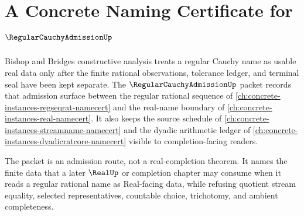 \chapter{A Concrete Naming Certificate for $\RegularCauchyAdmissionUp$}
\label{ch:concrete-instances-regular-cauchy-admission-namecert}

Bishop and Bridges constructive analysis treats a regular Cauchy name as usable real data only after the finite rational observations, tolerance ledger, and terminal seal have been kept separate. The $\RegularCauchyAdmissionUp$ packet records that admission surface between the regular rational sequence of \autoref{ch:concrete-instances-regseqrat-namecert} and the real-name boundary of \autoref{ch:concrete-instances-real-namecert}. It also keeps the source schedule of \autoref{ch:concrete-instances-streamname-namecert} and the dyadic arithmetic ledger of \autoref{ch:concrete-instances-dyadicratcore-namecert} visible to completion-facing readers.

The packet is an admission route, not a real-completion theorem. It names the finite data that a later $\RealUp$ or completion chapter may consume when it reads a regular rational name as Real-facing data, while refusing quotient stream equality, selected representatives, countable choice, trichotomy, and ambient completeness.

